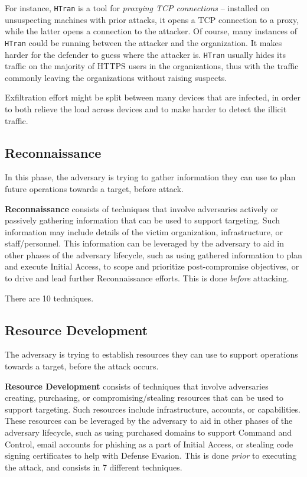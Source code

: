 \documentclass[10pt]{extreport}
\begin{document}
For instance, \texttt{HTran} is a tool for \emph{proxying TCP connections} --
installed on unsuspecting machines with prior attacks, it opens a TCP
connection to a proxy, while the latter opens a connection to the attacker. Of
course, many instances of \texttt{HTran} could be running between the attacker
and the organization. It makes harder for the defender to guess where the
attacker is. \texttt{HTran} usually hides its traffic on the majority of HTTPS
users in the organizations, thus with the traffic commonly leaving the
organizations without raising suspects. 

Exfiltration effort might be split between many devices that are
infected, in order to both relieve the load across devices and to make harder
to detect the illicit traffic.

\subsection{Reconnaissance}

In this phase, the adversary is trying to gather information they can use to
plan future operations towards a target, before attack.

\textbf{Reconnaissance} consists of techniques that involve adversaries
actively or passively gathering information that can be used to support
targeting. Such information may include details of the victim organization,
infrastructure, or staff/personnel. This information can be leveraged by the
adversary to aid in other phases of the adversary lifecycle, such as using
gathered information to plan and execute Initial Access, to scope and
prioritize post-compromise objectives, or to drive and lead further
Reconnaissance efforts. This is done \emph{before} attacking.

There are 10 techniques.

\subsection{Resource Development}

The adversary is trying to establish resources they can use to support
operations towards a target, before the attack occurs.

\textbf{Resource Development} consists of techniques that involve adversaries
creating, purchasing, or compromising/stealing resources that can be used to
support targeting. Such resources include infrastructure, accounts, or
capabilities. These resources can be leveraged by the adversary to aid in other
phases of the adversary lifecycle, such as using purchased domains to support
Command and Control, email accounts for phishing as a part of Initial Access,
or stealing code signing certificates to help with Defense Evasion. This is
done \emph{prior} to executing the attack, and consists in 7 different
techniques.
\end{document}
